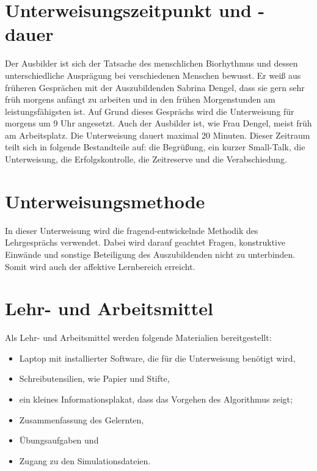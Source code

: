 \section{Unterweisungszeitpunkt und -dauer}
Der Ausbilder ist sich der Tatsache des menschlichen Biorhythmus und dessen unterschiedliche Ausprägung bei verschiedenen Menschen bewusst. Er weiß aus früheren Gesprächen mit der Auszubildenden Sabrina Dengel, dass sie gern sehr früh morgens anfängt zu arbeiten und in den frühen Morgenstunden am leistungsfähigsten ist. Auf Grund dieses Gesprächs wird die Unterweisung für morgens um 9 Uhr angesetzt. Auch der Ausbilder ist, wie Frau Dengel, meist früh am Arbeitsplatz. Die Unterweisung dauert maximal 20 Minuten. Dieser Zeitraum teilt sich in folgende Bestandteile auf: die Begrüßung, ein kurzer Small-Talk, die Unterweisung, die Erfolgskontrolle, die Zeitreserve und die Verabschiedung.

\section{Unterweisungsmethode}
In dieser Unterweisung wird die fragend-entwickelnde Methodik des Lehrgesprächs verwendet. Dabei wird darauf geachtet Fragen, konstruktive Einwände und sonstige Beteiligung des Auszubildenden nicht zu unterbinden. Somit wird auch der affektive Lernbereich erreicht. 

\section{Lehr- und Arbeitsmittel}
Als Lehr- und Arbeitsmittel werden folgende Materialien bereitgestellt: 
\begin{itemize}
	\item Laptop mit installierter Software, die für die Unterweisung benötigt wird,
	\item Schreibutensilien, wie Papier und Stifte, 
	\item ein kleines Informationsplakat, dass das Vorgehen des Algorithmus zeigt;
	\item Zusammenfassung des Gelernten,
	\item Übungsaufgaben und 
	\item Zugang zu den Simulationsdateien.
\end{itemize}


